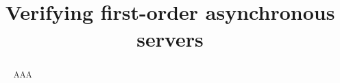 \documentclass[english,a4paper,cleveref,thm-restate,hidecoq]{lipics-style/lipics-v2021}
\title{Verifying first-order asynchronous servers}
\begin{document}
\maketitle

\begin{abstract}
  AAA
\end{abstract}











%
%

\clearpage

\newcommand{\asleqAfw}{\preccurlyeq^{\fw}_{\textsf{acc}}}
\newcommand{\ohmy}{O}

\appendix%


\end{document}
